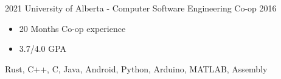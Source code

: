 
  

\begin{experiences}
    \experience
      {2021}   {University of Alberta - Computer Software Engineering Co-op}{}{}
      {2016} {
                        \begin{itemize}
                          \item 20 Months Co-op experience
                          \item 3.7/4.0 GPA
                        \end{itemize}
                      }
                      {
                        Rust,
                        C++,
                        C,
                        Java,
                        Android,
                        Python,
                        Arduino,
                        MATLAB,
                        Assembly
                      }
  
  \end{experiences}
